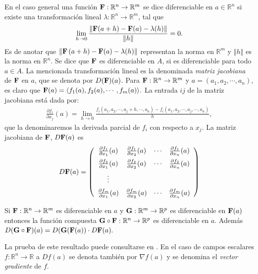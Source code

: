 En el caso general una función ${\bf F}:\mathbb{R}^{n}\rightarrow \mathbb{R}^{m}$ se dice
diferenciable en $a\in \mathbb{R}^{n}$
si existe una transformación lineal $\lambda :\mathbb{R}^{n}\rightarrow \mathbb{R}^{m}$, tal que
$$\lim_{h\rightarrow 0}\frac{\left\Vert {\bf F}(a+h)-{\bf F}(a)-\lambda(h)\right\Vert }{\left\Vert h\right\Vert }=0.$$
Es de anotar que $\left\Vert {\bf F}\left( a+h\right) -{\bf F}(a) -\lambda(h) \right\Vert$ representan la norma en
$\mathbb{R}^{m}$ y $\left\Vert h\right\Vert $ es la norma en $\mathbb{R}^{n}$. 
Se dice que ${\bf F}$ es diferenciable en $A$, si es diferenciable para todo $a\in A$.
La mencionada transformación lineal es la denominada \emph{matriz jacobiana} de ${\bf F}$ en $a$,
que se denota por $D({\bf F})(a)$. Para ${\bf F}:\mathbb{R}^n\to {\mathbb R}^m$ y $a=(a_1,a_2,\cdots, a_n)$, es claro que
${\bf F}(a)=\langle f_1(a),f_2(a), \cdots, f_m(a) \rangle.$
La entrada $ij$ de la matriz jacobiana está dada por:
\begin{gather*}
  \frac{\partial f_i}{\partial x_j}(a)=\lim_{h\rightarrow 0}\frac{f_i(a_1,a_2,\cdots,a_j+h,\cdots,a_n)-f_i(a_1,a_2,\cdots,a_j,\cdots, a_n)}{h},
\end{gather*}
que la denominaremos la derivada parcial de $f_i$ con respecto a $x_j$. 
La matriz jacobiana de ${\bf F}$, $D{\bf F}(a)$ es
\[D{\bf F}(a)=\left(
    \begin{array}{cccc}
      \frac{\partial f_1}{\partial x_1}(a)&\frac{\partial f_1}{\partial x_2}(a)&\cdots & \frac{\partial f_1}{\partial x_n}(a)\\[0.2cm]
      \frac{\partial f_2}{\partial x_1}(a)&\frac{\partial f_2}{\partial x_2}(a)&\cdots & \frac{\partial f_2}{\partial x_n}(a)\\[0.2cm]
      \vdots \\[0.2cm]
      \frac{\partial f_m}{\partial x_1}(a)&\frac{\partial f_m}{\partial x_2}(a)&\cdots & \frac{\partial f_m}{\partial x_n}(a)
\end{array} \right)\]
\begin{teorema}
  Si ${\bf F}:\mathbb{R}^n \to \mathbb{R}^m$ es diferenciable en $a$ y
  ${\bf G}:\mathbb{R}^m \to \mathbb{R}^p$ es diferenciable en ${\bf F}(a)$ entonces la función compuesta
  ${\bf G}\circ {\bf F}:\mathbb{R}^n \to \mathbb{R}^p$ es diferenciable en $a$. Además
  $D({\bf G}\circ {\bf F})(a)=D({\bf G}( {\bf F}(a))\cdot D{\bf F}(a). $
  \end{teorema}
  La prueba de este resultado puede consultarse en \textcite{spivak_calculus_2018}.
  En el caso de campos escalares $f:\mathbb{R}^n \to \mathbb{R}$ a $Df(a)$ se denota también por
  $\nabla f(a)$ y se denomina el \emph{vector gradiente} de $f$. 

